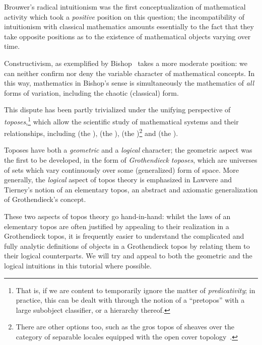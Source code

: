 \documentclass{article}
\begin{document}
Brouwer's radical intuitionism was the first conceptualization of
mathematical activity which took a \emph{positive} position on this
question; the incompatibility of intuitionism with classical
mathematics amounts essentially to the fact that they take opposite
positions as to the existence of mathematical objects varying over
time.

Constructivism, as exemplified by Bishop~\cite{bishop:1967} takes a
more moderate position: we can neither confirm nor deny the variable
character of mathematical concepts. In this way, mathematics in
Bishop's sense is simultaneously the mathematics of \emph{all} forms
of variation, including the chaotic (classical) form.

This dispute has been partly trivialized under the unifying
perspective of \emph{toposes},\footnote{That is, if we are content to
  temporarily ignore the matter of \emph{predicativity}; in practice,
  this can be dealt with through the notion of a ``pretopos'' with a
  large subobject classifier, or a hierarchy thereof.}  which allow
the scientific study of mathematical systems and their relationships,
including  (the ),
 (the ),
 (the )\footnote{There are other options too, such as
  the gros topos of sheaves over the category of separable locales
  equipped with the open cover
  topology~\cite{fourman:1984,fourman:2013}.} and  (the ).

Toposes have both a \emph{geometric} and a \emph{logical} character;
the geometric aspect was the first to be developed, in the form of
\emph{Grothendieck toposes}, which are universes of sets which vary
continuously over some (generalized) form of space. More generally,
the \emph{logical} aspect of topos theory is emphasized in Lawvere and
Tierney's notion of an elementary topos, an abstract and axiomatic
generalization of Grothendieck's concept.

These two aspects of topos theory go hand-in-hand: whilst the laws of
an elementary topos are often justified by appealing to their
realization in a Grothendieck topos, it is frequently easier to
understand the complicated and fully analytic definitions of objects
in a Grothendieck topos by relating them to their logical
counterparts. We will try and appeal to both the geometric and the
logical intuitions in this tutorial where possible.
\end{document}
